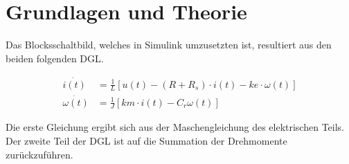 \section{Grundlagen und Theorie}

Das Blocksschaltbild, welches in Simulink umzusetzten ist, resultiert aus
den beiden folgenden DGL.

\begin{equation} \label{eq211}
    \begin{split}
        \dot{i(t)}&=\frac{1}{L} \left[ u(t) - (R + R_s) \cdot i(t) - ke \cdot \omega(t) \right]\\
        \dot{\omega(t)}&=\frac{1}{J} \left[km \cdot i(t) -C_r \omega(t) \right]
    \end{split}
\end{equation}

Die erste Gleichung ergibt sich aus der Maschengleichung des elektrischen Teils.
Der zweite Teil der DGL ist auf die Summation der Drehmomente zurückzuführen.